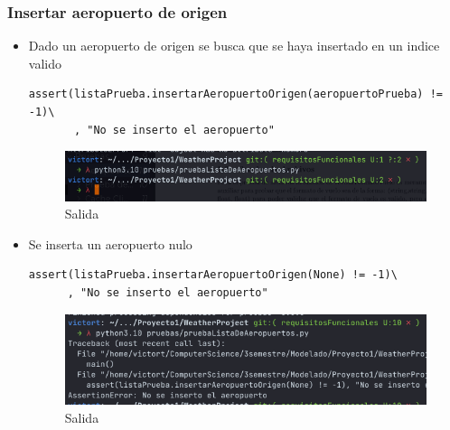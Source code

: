 \documentclass[12pt]{article}
\begin{document}
\subsubsection{Insertar aeropuerto de origen}
\begin{itemize}
\item Dado un aeropuerto de origen se busca que se haya insertado en un indice valido
\begin{verbatim}
assert(listaPrueba.insertarAeropuertoOrigen(aeropuertoPrueba) != -1)\
       , "No se inserto el aeropuerto"
\end{verbatim}
\begin{figure}[h!]
    \centering
    \includegraphics[scale=0.6]{pruebasPy/listaAeropuertos/bien.png}
    \caption{Salida}
  \end{figure}
\item Se inserta un aeropuerto nulo
\begin{verbatim}
assert(listaPrueba.insertarAeropuertoOrigen(None) != -1)\
      , "No se inserto el aeropuerto"
\end{verbatim}
\begin{figure}[h!]
    \centering
    \includegraphics[scale=0.6]{pruebasPy/listaAeropuertos/insertaNone.png}
    \caption{Salida}
  \end{figure}
\end{itemize}
\end{document}
